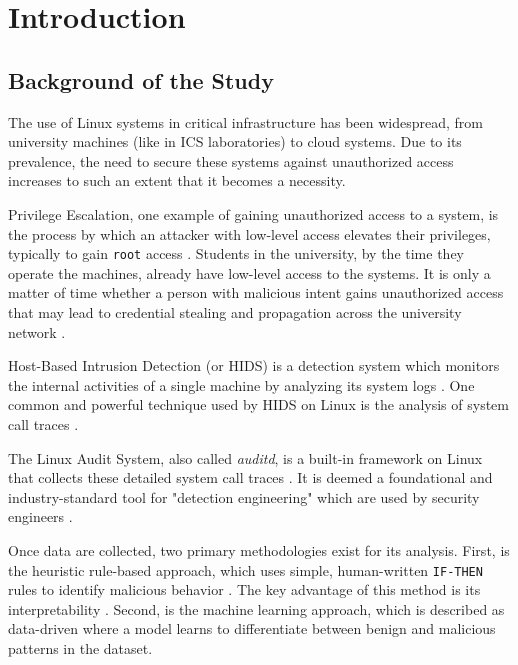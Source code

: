 \documentclass[journal]{./IEEEtran}
\title{\SPTITLE}
\author{\ADVISEE~and~\ADVISER%
\REMARK
}
\begin{document}
\maketitle

\section{Introduction}

\subsection{Background of the Study}
The use of Linux systems in critical infrastructure has been widespread, from university machines (like in ICS laboratories) to cloud systems. Due to its prevalence, the need to secure these systems against unauthorized access increases to such an extent that it becomes a necessity.

Privilege Escalation, one example of gaining unauthorized access to a system, is  the process by which an attacker with low-level access elevates their privileges, typically to gain \texttt{root} access \cite{happe2024}. Students in the university, by the time they operate the machines, already have low-level access to the systems. It is only a matter of time whether a person with malicious intent gains unauthorized access that may lead to credential stealing and propagation across the university network \cite{schroder2025}. 

Host-Based Intrusion Detection (or HIDS) is a detection system which monitors the internal activities of a single machine by analyzing its system logs \cite{shin2020}. One common and powerful technique used by HIDS on Linux is the analysis of system call traces \cite{shin2020}. 

The Linux Audit System, also called \textit{auditd}, is a built-in framework on Linux that collects these detailed system call traces \cite{groenewoud2024}. It is deemed a foundational and industry-standard tool for "detection engineering" which are used by security engineers \cite{groenewoud2024}.

Once data are collected, two primary methodologies exist for its analysis. First, is the heuristic rule-based approach, which uses simple, human-written \texttt{IF-THEN} rules to identify malicious behavior \cite{liu2021}. The key advantage of this method is its interpretability \cite{liu2021}. Second, is the machine learning approach, which is described as data-driven where a model learns to differentiate between benign and malicious patterns in the dataset. 
\end{document}
